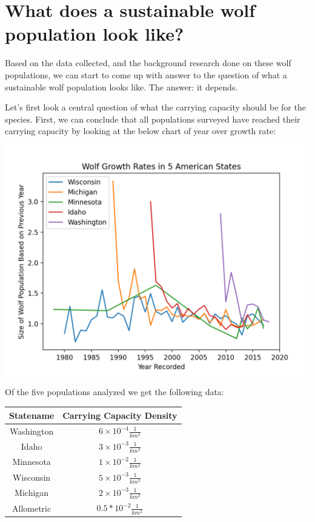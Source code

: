\documentclass[12pt]{article}
\begin{document}
\section{What does a sustainable wolf population look like?}

Based on the data collected, 
and the background research done on these wolf populations, 
we can start to come up with answer to the question of what a sustainable wolf population looks like. 
The answer: it depends.

Let's first look a central question of what the carrying capacity should be for the species. 
First, we can conclude that all populations surveyed have reached their carrying capacity by looking at the below 
chart of year over growth rate:

\includegraphics{lambda.png}

Of the five populations analyzed we get the following data: 

\begin{center}
    \begin{tabular}{| c | c |}
        \hline 
        Statename & Carrying Capacity Density \\ 
        \hline 
        Washington & $6 \times 10^{-4} \frac{1}{km^2}$ \\ 
        Idaho & $3 \times 10^{-3} \frac{1}{km^2}$ \\ 
        Minnesota & $1 \times 10^{-2} \frac{1}{km^2}$ \\ 
        Wisconsin & $5 \times 10^{-3} \frac{1}{km^2}$ \\ 
        Michigan & $2 \times 10^{-3} \frac{1}{km^2}$ \\ 
        \hline
        Allometric & $0.5*10^{-2} \frac{1}{km^2}$ \\
        \hline 
    \end{tabular}
\end{center} 
\end{document}
